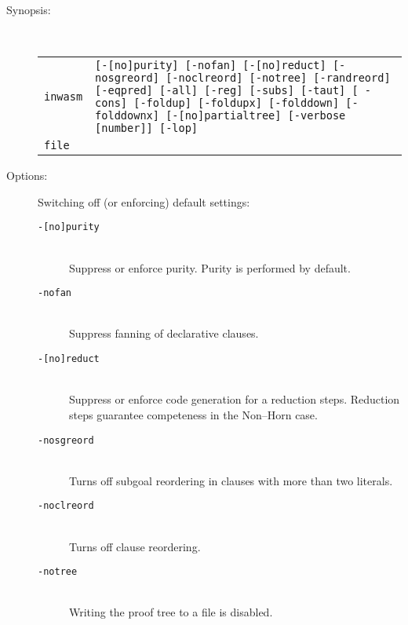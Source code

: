 \begin{description}
\item[Synopsis:]
     {\ \\
      \begin{tabular}{lp{10cm}}
      {\tt inwasm}  &  {\tt [-[no]purity] [-nofan] [-[no]reduct] 
                            [-nosgreord] [-noclreord] [-notree] 
                            [-randreord] [-eqpred] [-all] [-reg] 
                            [-subs] [-taut] [ -cons] [-foldup] 
                            [-foldupx] [-folddown] [-folddownx]
                            [-[no]partialtree] [-verbose  [number]]
                            [-lop]}  \\
      {\tt file}    &  
      \end{tabular}}
\item[Options:]
     {Switching off (or enforcing) default settings:
      \begin{description}
      \item[{\tt -[no]purity}]
           {\ \\
            Suppress or enforce purity. Purity is performed by default.}
      \item[{\tt -nofan}]
           {\ \\
            Suppress fanning of declarative clauses.}
      \item[{\tt -[no]reduct}]
           {\ \\
            Suppress or enforce code  generation  for  a  reduction 
            steps.  Reduction  steps  guarantee  competeness in the
            Non--Horn case.}
      \item[{\tt -nosgreord}]
           {\ \\
            Turns off subgoal reordering in clauses with more  than
            two literals.}
      \item[{\tt -noclreord}]
           {\ \\
            Turns off clause reordering.}
      \item[{\tt -notree}]
           {\ \\
            Writing the proof tree to a file is disabled.}
      \end{description}

}
\end{description}

